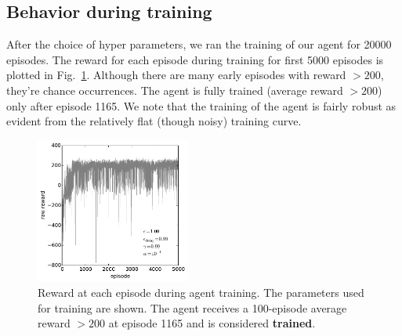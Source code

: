 \documentclass[conference]{IEEEtran}
\begin{document}
\subsection{Behavior during training}
After the choice of hyper parameters, we ran the training of our agent for 20000 episodes. The reward for each episode during training for first 5000 episodes is plotted in Fig.~\ref{fig:fig1}. Although there are many early episodes with reward $>200$, they're chance occurrences. The agent is fully trained (average reward $>200$) only after episode 1165. We note that the training of the agent is fairly robust as evident from the relatively flat (though noisy) training curve.
\begin{figure}[tbp]
    \centering
    \includegraphics[width=0.45\textwidth]{./figures/fig1.pdf}
    \caption{Reward at each episode during agent training. The parameters used for training are shown. The agent receives a 100-episode average reward $>200$ at episode 1165 and is considered {\bf trained}. \label{fig:fig1}}
\end{figure}
\end{document}
